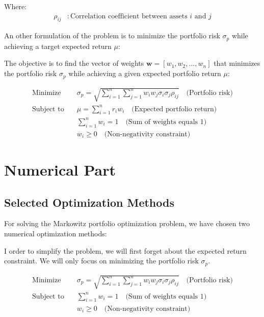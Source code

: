 \documentclass[12pt]{article}
\begin{document}
Where:
\begin{align*}
    \rho_{ij} & : \text{Correlation coefficient between assets } i \text{ and } j
\end{align*}


An other formulation of the problem is to minimize the portfolio risk $\sigma_p$ while achieving a target expected return $\mu$:

The objective is to find the vector of weights $\mathbf{w} = [w_1, w_2, \ldots, w_n]$ that minimizes the portfolio risk $\sigma_p$ while achieving a given expected portfolio return $\mu$:

\begin{equation}
    \begin{aligned}
        \text{Minimize} \quad   & \sigma_p = \sqrt{\sum_{i=1}^{n}\sum_{j=1}^{n} w_i w_j \sigma_i \sigma_j \rho_{ij}} \quad \text{(Portfolio risk)} \\
        \text{Subject to} \quad & \mu = \sum_{i=1}^{n} r_i w_i \quad \text{(Expected portfolio return)}                                             \\
                                & \sum_{i=1}^{n} w_i = 1 \quad \text{(Sum of weights equals 1)}                                                        \\
                                & w_i \geq 0 \quad \text{(Non-negativity constraint)}
    \end{aligned}
\end{equation}

\section*{Numerical Part}

\subsection*{Selected Optimization Methods}

For solving the Markowitz portfolio optimization problem, we have chosen two numerical optimization methods:


I order to simplify the problem, we will first forget about the expected return constraint. We will only focus on minimizing the portfolio risk $\sigma_p$.

\begin{equation}
    \begin{aligned}
        \text{Minimize} \quad   & \sigma_p = \sqrt{\sum_{i=1}^{n}\sum_{j=1}^{n} w_i w_j \sigma_i \sigma_j \rho_{ij}} \quad \text{(Portfolio risk)} \\
        \text{Subject to} \quad & \sum_{i=1}^{n} w_i = 1 \quad \text{(Sum of weights equals 1)}                                                        \\
                                & w_i \geq 0 \quad \text{(Non-negativity constraint)}
    \end{aligned}
\end{equation}
\end{document}
